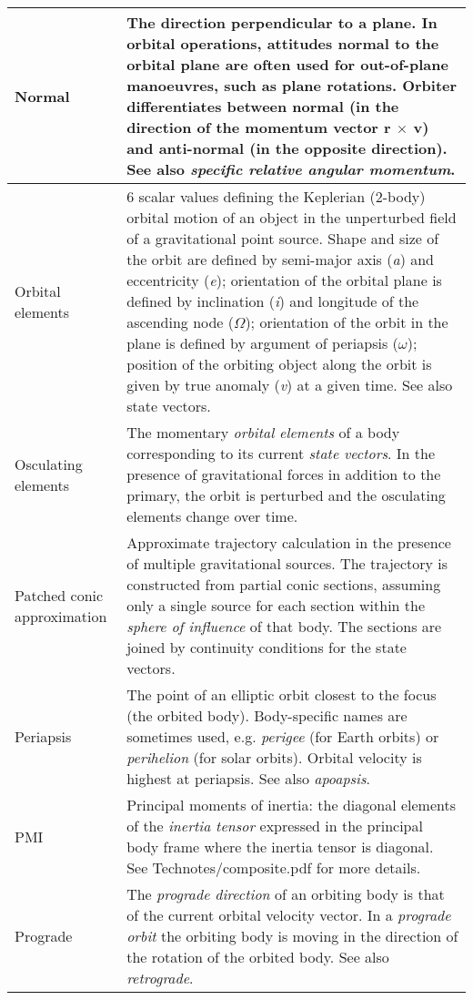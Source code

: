 \documentclass[Orbiter User Manual.tex]{subfiles}
\begin{document}
\begin{longtable}{ |p{}|p{}| }
	\hline\rule{0pt}{2ex}
	Normal & The direction perpendicular to a plane. In orbital operations, attitudes normal to the orbital plane are often used for out-of-plane manoeuvres, such as plane rotations. Orbiter differentiates between normal (in the direction of the momentum vector \textbf{r} $\times$ \textbf{v}) and anti-normal (in the opposite direction). See also \textit{specific relative angular momentum}.\\
	\hline\rule{0pt}{2ex}
	Orbital elements & 6 scalar values defining the Keplerian (2-body) orbital motion of an object in the unperturbed field of a gravitational point source. Shape and size of the orbit are defined by semi-major axis (\textit{a}) and eccentricity (\textit{e}); orientation of the orbital plane is defined by inclination (\textit{i}) and longitude of the ascending node ($\Omega$); orientation of the orbit in the plane is defined by argument of periapsis ($\omega$); position of the orbiting object along the orbit is given by true anomaly (\textit{v}) at a given time. See also state vectors.\\
	\hline\rule{0pt}{2ex}
	Osculating elements & The momentary \textit{orbital elements} of a body corresponding to its current \textit{state vectors}. In the presence of gravitational forces in addition to the primary, the orbit is perturbed and the osculating elements change over time.\\
	\hline\rule{0pt}{2ex}
	Patched conic approximation & Approximate trajectory calculation in the presence of multiple gravitational sources. The trajectory is constructed from partial conic sections, assuming only a single source for each section within the \textit{sphere of influence} of that body. The sections are joined by continuity conditions for the state vectors.\\
	\hline\rule{0pt}{2ex}
	Periapsis & The point of an elliptic orbit closest to the focus (the orbited body). Body-specific names are sometimes used, e.g. \textit{perigee} (for Earth orbits) or \textit{perihelion} (for solar orbits). Orbital velocity is highest at periapsis. See also \textit{apoapsis}.\\
	\hline\rule{0pt}{2ex}
	PMI & Principal moments of inertia: the diagonal elements of the \textit{inertia tensor} expressed in the principal body frame where the inertia tensor is diagonal. See Technotes/composite.pdf for more details.\\
	\hline\rule{0pt}{2ex}
	Prograde & The \textit{prograde direction} of an orbiting body is that of the current orbital velocity vector. In a \textit{prograde orbit} the orbiting body is moving in the direction of the rotation of the orbited body. See also \textit{retrograde}.\\

\end{longtable}
\end{document}
